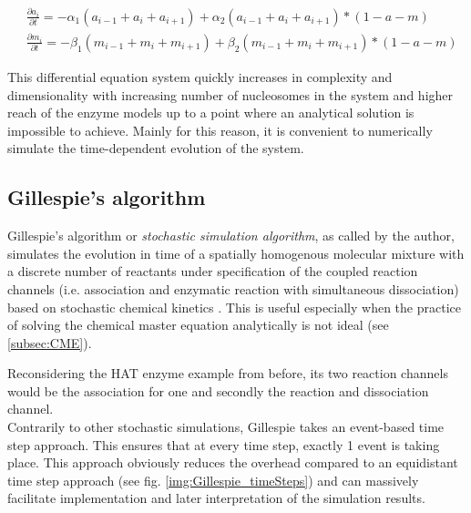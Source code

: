             \begin{subequations}
                \begin{align}
                    &\frac{\partial a_i}{\partial t} = - \alpha_1 (a_{i-1} + a_i + a_{i+1}) + \alpha_2 (a_{i-1} + a_i + a_{i+1})*(1-a-m)\\
                    &\frac{\partial m_i}{\partial t} = - \beta_1 (m_{i-1} + m_i + m_{i+1}) + \beta_2 (m_{i-1} + m_i + m_{i+1})*(1-a-m)
                \end{align}
                \label{eqn:neighbourDependent}
            \end{subequations}

            This differential equation system quickly increases in complexity and dimensionality with increasing number of nucleosomes in the system and higher reach of the enzyme models up to a point where an analytical solution is impossible to achieve. Mainly for this reason, it is convenient to numerically simulate the time-dependent evolution of the system.
        \subsection{Gillespie's algorithm}
        \label{subsec:Gillespie}
            Gillespie's algorithm or \textit{stochastic simulation algorithm}, as called by the author, simulates the evolution in time of a spatially homogenous molecular mixture with a discrete number of reactants under specification of the coupled reaction channels (i.e. association and enzymatic reaction with simultaneous dissociation) based on stochastic chemical kinetics \cite{gillespie1976general, gillespie1992rigorous}. This is useful especially when the practice of solving the chemical master equation analytically is not ideal (see \ref{subsec:CME}).

            Reconsidering the HAT enzyme example from before, its two reaction channels would be the association for one and secondly the reaction and dissociation channel. \\

            Contrarily to other stochastic simulations, Gillespie takes an event-based time step approach. This ensures that at every time step, exactly 1 event is taking place. This approach obviously reduces the overhead compared to an equidistant time step approach (see fig. \ref{img:Gillespie_timeSteps}) and can massively facilitate implementation and later interpretation of the simulation results.

